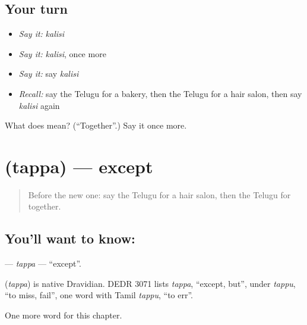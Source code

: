 \subsection*{Your turn}
\begin{itemize}
\raggedright
  \item \emph{Say it:} \emph{kalisi}
  \item \emph{Say it:} \emph{kalisi}, once more
  \item \emph{Say it:} say \emph{kalisi}
  \item \emph{Recall:} say the Telugu for a bakery, then the Telugu for a hair salon, then say \emph{kalisi} again
\end{itemize}

\begin{tcolorbox}[breakable,colback=teal!4,colframe=teal!35!black,title={Before you move on}]
What does  mean? (\textquotedblleft{}Together\textquotedblright{}.) Say it once more.
\end{tcolorbox}
\section[\texorpdfstring{\te{తప్ప} (tappa)}{తప్ప (tappa)}]{ (tappa) — except}

\label{lesson:TE-C217-tappa}



\begin{quote}
Before the new one: say the Telugu for a hair salon, then the Telugu for together.
\end{quote}

\subsection*{You'll want to know: }
\textbf{} — \emph{tappa} — \textquotedblleft{}except\textquotedblright{}.

\begin{cousinweb}
\textbf{} (\emph{tappa}) is native Dravidian. DEDR 3071 lists \emph{tappa}, \textquotedblleft{}except, but\textquotedblright{}, under \emph{tappu}, \textquotedblleft{}to miss, fail\textquotedblright{}, one word with Tamil \emph{tappu}, \textquotedblleft{}to err\textquotedblright{}.
\end{cousinweb}

\begin{grammarlens}[title={What you've built}]
One more word for this chapter.
\end{grammarlens}

